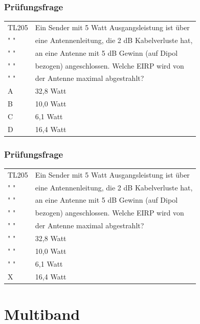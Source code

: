 \begin{frame}
    \frametitle{Prüfungsfrage}

    \begin{center}
    \begin{tabular}{l||l}\hline
        TL205 & Ein Sender mit 5 Watt Ausgangsleistung ist über\\
        " "  & eine Antennenleitung, die 2 dB Kabelverluste hat,\\
        " "  & an eine Antenne mit 5 dB Gewinn (auf Dipol\\
        " "  & bezogen) angeschlossen. Welche EIRP wird von \\
        " "  &  der Antenne maximal abgestrahlt?\\\hline\hline
         A 	  & 32,8 Watt \\\hline
         B 	  & 10,0 Watt \\\hline
         C	  & 6,1 Watt \\\hline
         D 	  & 16,4 Watt\\\hline
    \end{tabular}
 	\end{center}
\end{frame}

\begin{frame}
    \frametitle{Prüfungsfrage}

    \begin{center}
    \begin{tabular}{l||l}\hline
        TL205 & Ein Sender mit 5 Watt Ausgangsleistung ist über\\
        " "  & eine Antennenleitung, die 2 dB Kabelverluste hat,\\
        " "  & an eine Antenne mit 5 dB Gewinn (auf Dipol\\
        " "  & bezogen) angeschlossen. Welche EIRP wird von \\
        " "  &  der Antenne maximal abgestrahlt?\\\hline\hline
         " " 	  & 32,8 Watt \\\hline
         " " 	  & 10,0 Watt \\\hline
         " "	  & 6,1 Watt \\\hline
         X 	  & 16,4 Watt\\\hline
    \end{tabular}
 	\end{center}
\end{frame}

\section*{Multiband}

